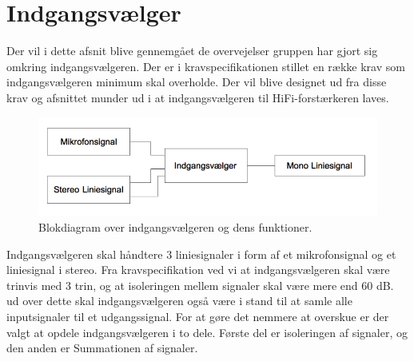 \chapter{Indgangsvælger}
\label{indgangsvaelger}
Der vil i dette afsnit blive gennemgået de overvejelser gruppen har gjort sig omkring indgangsvælgeren. Der er i kravspecifikationen stillet en række krav som indgangsvælgeren minimum skal overholde. Der vil blive designet ud fra disse krav og afsnittet munder ud i at indgangsvælgeren til HiFi-forstærkeren laves.

\begin{figure}[h]
\centering
\includegraphics[scale=0.6]{teknisk/indgangsvaelger/overordnetdesign.png}
\caption{Blokdiagram over indgangsvælgeren og dens funktioner.}
\label{indgangsvaelger-overordnet}
\end{figure}

Indgangsvælgeren skal håndtere 3 liniesignaler i form af et mikrofonsignal og et liniesignal i stereo. Fra kravspecifikation ved vi at indgangsvælgeren skal være trinvis med 3 trin, og at isoleringen mellem signaler skal være mere end 60 dB. ud over dette skal indgangsvælgeren også være i stand til at samle alle inputsignaler til et udgangssignal. For at gøre det nemmere at overskue er der valgt at opdele indgangsvælgeren i to dele. Første del er isoleringen af signaler, og den anden er Summationen af signaler.



